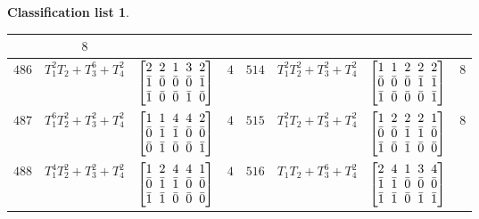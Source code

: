 \documentclass[10pt,a4paper]{amsart}
\theoremstyle{definition}
\newtheorem{class-list}[thm]{Classification list}
\numberwithin{equation}{section}
\begin{document}
\begin{class-list}
\begin{table}[t!]
\begin{tabu}{c|c|c|c||c|c|c|c}
&${8}$
\\
\hline
${486}$&${T_{1}^{2}T_{2}+T_{3}^{6}+T_{4}^{2}}$&
$\arraycolsep=1mm\begin{bmatrix}{2} & {2} & {1} & {3} & {2} \\ {\bar{1}} & {\bar{0}} & {\bar{0}} & {\bar{0}} & {\bar{1}} \\ {\bar{1}} & {\bar{0}} & {\bar{0}} & {\bar{1}} & {\bar{0}}\end{bmatrix}$
&${4}$
&${514}$&${T_{1}^{2}T_{2}^{2}+T_{3}^{2}+T_{4}^{2}}$
&$\arraycolsep=1mm\begin{bmatrix}{1} & {1} & {2} & {2} & {2} \\ {\bar{0}} & {\bar{0}} & {\bar{0}} & {\bar{1}} & {\bar{1}} \\ {\bar{1}} & {\bar{0}} & {\bar{0}} & {\bar{0}} & {\bar{1}}\end{bmatrix}$
&${8}$
\\
\hline
${487}$&${T_{1}^{6}T_{2}^{2}+T_{3}^{2}+T_{4}^{2}}$
&$\arraycolsep=1mm\begin{bmatrix}{1} & {1} & {4} & {4} & {2} \\ {\bar{0}} & {\bar{1}} & {\bar{1}} & {\bar{0}} & {\bar{0}} \\ {\bar{0}} & {\bar{1}} & {\bar{0}} & {\bar{0}} & {\bar{1}}\end{bmatrix}$
&${4}$
&${515}$&${T_{1}^{2}T_{2}+T_{3}^{2}+T_{4}^{2}}$
&$\arraycolsep=1mm\begin{bmatrix}{1} & {2} & {2} & {2} & {1} \\ {\bar{0}} & {\bar{0}} & {\bar{1}} & {\bar{1}} & {\bar{0}} \\ {\bar{1}} & {\bar{0}} & {\bar{1}} & {\bar{0}} & {\bar{0}}\end{bmatrix}$
&${8}$
\\
\hline
${488}$&${T_{1}^{4}T_{2}^{2}+T_{3}^{2}+T_{4}^{2}}$
&$\arraycolsep=1mm\begin{bmatrix}{1} & {2} & {4} & {4} & {1} \\ {\bar{0}} & {\bar{1}} & {\bar{1}} & {\bar{0}} & {\bar{0}} \\ {\bar{1}} & {\bar{1}} & {\bar{0}} & {\bar{0}} & {\bar{0}}\end{bmatrix}$
&${4}$
&${516}$&${T_{1}T_{2}+T_{3}^{6}+T_{4}^{2}}$
&$\arraycolsep=1mm\begin{bmatrix}{2} & {4} & {1} & {3} & {4} \\ {\bar{1}} & {\bar{1}} & {\bar{0}} & {\bar{0}} & {\bar{0}} \\ {\bar{1}} & {\bar{1}} & {\bar{0}} & {\bar{1}} & {\bar{1}}\end{bmatrix}$

\end{tabu}
\end{table}
\end{class-list}
\end{document}
